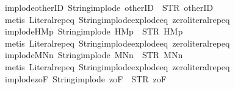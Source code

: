 \begin{isabellebody}
\endisatagproof
{\isafoldproof}%
%
\isadelimproof
\isanewline
%
\endisadelimproof
\isanewline
{}\isamarkupfalse%
\ implode{\isacharunderscore}otherID{\isacharcolon}\ {\isachardoublequoteopen}String{\isachardot}implode\ {\isacharprime}{\isacharprime}otherID{\isacharprime}{\isacharprime}\ {\isacharequal}\ STR\ {\isacharprime}{\isacharprime}otherID{\isacharprime}{\isacharprime}{\isachardoublequoteclose}\isanewline
%
\isadelimproof
\ \ %
\endisadelimproof
%
\isatagproof
{}\isamarkupfalse%
\ {\isacharparenleft}metis\ Literal{\isachardot}rep{\isacharunderscore}eq\ String{\isachardot}implode{\isacharunderscore}explode{\isacharunderscore}eq\ zero{\isacharunderscore}literal{\isachardot}rep{\isacharunderscore}eq{\isacharparenright}%
\endisatagproof
{\isafoldproof}%
%
\isadelimproof
\isanewline
%
\endisadelimproof
\isanewline
{}\isamarkupfalse%
\ implode{\isacharunderscore}HM{}p{\isacharcolon}\ {\isachardoublequoteopen}String{\isachardot}implode\ {\isacharprime}{\isacharprime}HM{}p{\isacharprime}{\isacharprime}\ {\isacharequal}\ STR\ {\isacharprime}{\isacharprime}HM{}p{\isacharprime}{\isacharprime}{\isachardoublequoteclose}\isanewline
%
\isadelimproof
\ \ %
\endisadelimproof
%
\isatagproof
{}\isamarkupfalse%
\ {\isacharparenleft}metis\ Literal{\isachardot}rep{\isacharunderscore}eq\ String{\isachardot}implode{\isacharunderscore}explode{\isacharunderscore}eq\ zero{\isacharunderscore}literal{\isachardot}rep{\isacharunderscore}eq{\isacharparenright}%
\endisatagproof
{\isafoldproof}%
%
\isadelimproof
\isanewline
%
\endisadelimproof
\isanewline
{}\isamarkupfalse%
\ implode{\isacharunderscore}MNn{}{\isacharcolon}\ {\isachardoublequoteopen}String{\isachardot}implode\ {\isacharprime}{\isacharprime}MNn{}{\isacharprime}{\isacharprime}\ {\isacharequal}\ STR\ {\isacharprime}{\isacharprime}MNn{}{\isacharprime}{\isacharprime}{\isachardoublequoteclose}\isanewline
%
\isadelimproof
\ \ %
\endisadelimproof
%
\isatagproof
{}\isamarkupfalse%
\ {\isacharparenleft}metis\ Literal{\isachardot}rep{\isacharunderscore}eq\ String{\isachardot}implode{\isacharunderscore}explode{\isacharunderscore}eq\ zero{\isacharunderscore}literal{\isachardot}rep{\isacharunderscore}eq{\isacharparenright}%
\endisatagproof
{\isafoldproof}%
%
\isadelimproof
\isanewline
%
\endisadelimproof
\isanewline
{}\isamarkupfalse%
\ implode{\isacharunderscore}{}zoF{\isacharcolon}\ {\isachardoublequoteopen}String{\isachardot}implode\ {\isacharprime}{\isacharprime}{}zoF{\isacharprime}{\isacharprime}\ {\isacharequal}\ STR\ {\isacharprime}{\isacharprime}{}zoF{\isacharprime}{\isacharprime}{\isachardoublequoteclose}\isanewline

\end{isabellebody}

